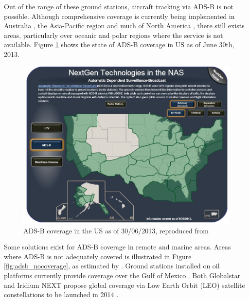 Out of the range of these ground stations, aircraft tracking via ADS-B is not possible.  Although comprehensive coverage is currently being implemented in Australia \cite{ADSB_CASA_booklet}, the Asia-Pacific region \cite{ADSB_ICAO_man} and much of North America \cite{ADSB_DOT}, there still exists areas, particularly over oceanic and polar regions where the service is not available. Figure \ref{fig:adsb_us_coverage} shows the state of ADS-B coverage in US as of June 30th, 2013.
\begin{figure}[H]
	\centering
	\includegraphics[scale = 0.5]{Pictures/adsb_coverage_US.jpg}
	
	\caption[ADS-B coverage in the US as of 30/06/2013]{ADS-B coverage in the US as of 30/06/2013, reproduced from \cite{NextGEN_coverage_map}}
	\label{fig:adsb_us_coverage}
\end{figure}
Some solutions exist for ADS-B coverage in remote and marine areas. Areas where ADS-B is not adequately covered is illustrated in Figure \ref{fig:adsb_nocoverage}, as  estimated by \cite{ADS-B:Aireon_brochure}. Ground stations installed on oil platforms currently provide coverage over the Gulf of Mexico \cite{ADSB_DOT}. Both Globalstar and Iridium NEXT propose global coverage via Low Earth Orbit (LEO) satellite constellations to be launched in 2014 \cite{ADS-B:Globalstar_webinar,ADS-B:Aireon_brochure}.

